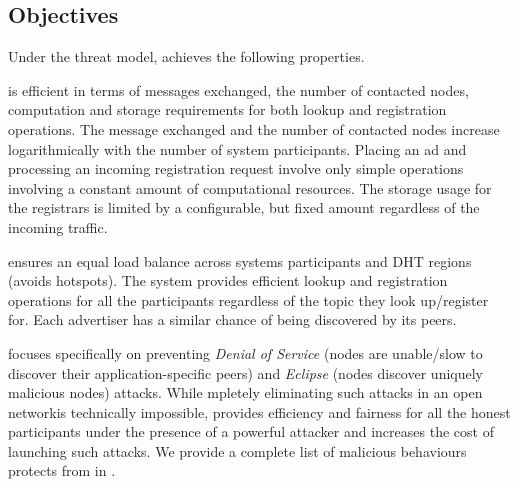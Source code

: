 \subsection{Objectives}
Under the threat model, \sysname achieves the following properties.

 \sysname is efficient in terms of messages exchanged, the number of contacted nodes, computation and storage requirements for both lookup and registration operations. The message exchanged and the number of contacted nodes increase logarithmically with the number of system participants. Placing an ad and processing an incoming registration request involve only simple operations involving a constant amount of computational resources. The storage usage for the registrars is limited by a configurable, but fixed amount regardless of the incoming traffic. 


 \sysname ensures an equal load balance across systems participants and DHT regions (\ie avoids hotspots). The system provides efficient lookup and registration operations for all the participants regardless of the topic they look up/register for. Each advertiser has a similar chance of being discovered by its peers. 

 \sysname focuses specifically on preventing \emph{Denial of Service} (nodes are unable/slow to discover their application-specific peers) and \emph{Eclipse} (nodes discover uniquely malicious nodes) attacks. While mpletely eliminating such attacks in an open networkis technically impossible, \sysname provides efficiency and fairness for all the honest participants under the presence of a powerful attacker and increases the cost of launching such attacks. We provide a complete list of malicious behaviours \sysname protects from in . 